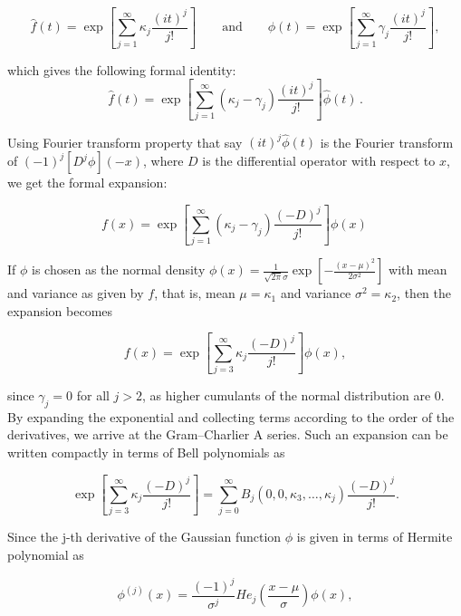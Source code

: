 \documentclass{imsart}
\numberwithin{equation}{section}
\theoremstyle{plain}
\theoremstyle{remark}
\begin{document}
\begin{equation}
\hat{f}(t)= \exp\left[\sum_{j=1}^\infty\kappa_j\frac{(it)^j}{j!}\right] \quad \quad \text{and} \quad \quad \hat{\phi}(t)=\exp\left[\sum_{j=1}^\infty\gamma_j\frac{(it)^j}{j!}\right],
\end{equation}

which gives the following formal identity:
\begin{equation}
\hat{f}(t)=\exp\left[\sum_{j=1}^\infty(\kappa_j-\gamma_j)\frac{(it)^j}{j!}\right]\hat{\phi}(t)\,.
\end{equation}

Using Fourier transform property that say $(it)^j \hat{\phi}(t)$ is the Fourier transform of $(-1)^j[D^j\phi](-x)$, where $D$ is the differential operator with respect to $x$, we get the formal expansion:

\begin{equation}
f(x) = \exp\left[\sum_{j=1}^\infty(\kappa_j - \gamma_j)\frac{(-D)^j}{j!}\right]\phi(x)\,
\end{equation}


If $\phi$ is chosen as the normal density $\phi(x) = \frac{1}{\sqrt{2\pi}\sigma}\exp\left[-\frac{(x-\mu)^2}{2\sigma^2}\right]$  with mean and variance as given by $f$, that is, mean $\mu = \kappa_1$ and variance $\sigma^2 = \kappa_2$, then the expansion becomes

\begin{equation}
f(x) = \exp\left[\sum_{j=3}^\infty\kappa_j\frac{(-D)^j}{j!}\right] \phi(x),
\end{equation}


since $ \gamma_j=0$ for all $j  > 2$, as higher cumulants of the normal distribution are 0. By expanding the exponential and collecting terms according to the order of the derivatives, we arrive at the Gram–Charlier A series. Such an expansion can be written compactly in terms of Bell polynomials as

\begin{equation}
\exp\left[\sum_{j=3}^\infty\kappa_j\frac{(-D)^j}{j!}\right] = \sum_{j=0}^\infty B_j(0,0,\kappa_3,\ldots,\kappa_j)\frac{(-D)^j}{j!}.
\end{equation}

Since the j-th derivative of the Gaussian function $\phi$ is given in terms of Hermite polynomial as

\begin{equation}
\phi^{(j)}(x) = \frac{(-1)^j}{\sigma^j} He_j \left( \frac{x-\mu}{\sigma} \right) \phi(x),
\end{equation}
\end{document}
